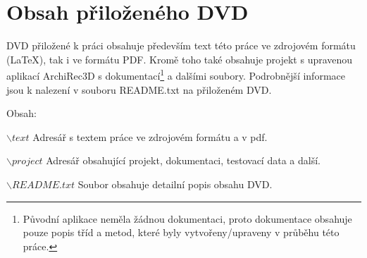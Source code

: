 \documentclass[11pt,twoside,a4paper]{book}
\begin{document}


%
{
\def\CS{$\cal C\kern-0.1667em\lower.5ex\hbox{$\cal S$}\kern-0.075em $}

}


\appendix	
\printnomenclature
\chapter{Obsah přiloženého DVD}
DVD přiložené k práci obsahuje především text této práce ve zdrojovém formátu (\LaTeX), tak i ve formátu PDF. Kromě toho také obsahuje projekt s upravenou aplikací ArchiRec3D s dokumentací\footnote{Původní aplikace neměla žádnou dokumentaci, proto dokumentace obsahuje pouze popis tříd a metod, které byly vytvořeny/upraveny v průběhu této práce.} a dalšími soubory. Podrobnější informace jsou k nalezení v souboru README.txt na přiloženém DVD.

\vspace{8mm}
Obsah:
\vspace{3mm}

$\backslash text$ \hspace{15mm} Adresář s textem práce ve zdrojovém formátu a v pdf.

$\backslash project$	\hspace{10mm} Adresář obsahující projekt, dokumentaci, testovací data a další.

$\backslash README.txt$	\hspace{10mm} Soubor obsahuje detailní popis obsahu DVD.
\end{document}

